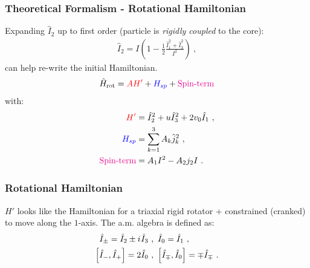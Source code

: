 \documentclass{beamer}
\newcommand{\iu}{{i\mkern1mu}}
\begin{document}
\begin{frame}
  \frametitle{Theoretical Formalism - Rotational Hamiltonian}

  Expanding $\hat{I}_2$ up to first order (particle is \emph{rigidly coupled} to the core):
  \begin{align}
    \hat{I}_2=I\left(1-\frac{1}{2}\frac{\hat{I}_1^2+\hat{I}_3^2}{I^2}\right)\ ,
  \end{align}
can help re-write the initial Hamiltonian. %
\begin{align}
  \hat{H}_\text{rot}={\color{red}AH'}+{\color{blue}H_{sp}}+{\color{magenta}\text{Spin-term}}
\end{align}
with:
\begin{align}
  {\color{red}H'}&=\hat{I}_2^2+u\hat{I}_3^2+2v_0\hat{I}_1\ ,\\
  {\color{blue}H_{sp}}&=\sum_{k=1}^3A_k\hat{j}_k^2\ ,\\
  {\color{magenta}\text{Spin-term}}&=A_1I^2-A_2j_2I\ .
\end{align}
\end{frame}

\begin{frame}
  \frametitle{Rotational Hamiltonian}
  $H'$ looks like the Hamiltonian for a triaxial rigid rotator + constrained (cranked) to move along the $1$-axis. The a.m. algebra is defined as:
\begin{align}
  \hat{I}_\pm=\hat{I}_2\pm \iu\hat{I}_3\ &,\ \hat{I}_0=\hat{I}_1\ ,\\
  \left[\hat{I}_-,\hat{I}_+\right]=2\hat{I}_0\ &,\ \left[\hat{I}_\mp,\hat{I}_0\right]=\mp\hat{I}_\mp\ .
\end{align}
\end{frame}
\end{document}
